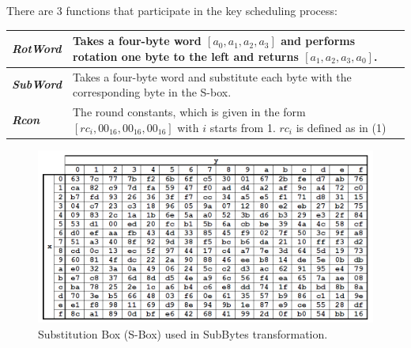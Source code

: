 \documentclass[a4paper, 10pt]{article}
\begin{document}
\begin{multicols}{2}
                There are 3 functions that participate in the key scheduling process:

                    \setlength{\tabcolsep}{5pt} %
                    \renewcommand{\arraystretch}{1.5} %
                    \noindent
                        \begin{tabular}{m{2cm} m{6cm}}
                            \textbf{\textit{RotWord}} & Takes a four-byte word $[a_{0},a_{1},a_{2},a_{3}]$ and performs rotation one byte to the left and returns $[a_{1},a_{2},a_{3},a_{0}]$.\\
                            \hline
                            \textbf{\textit{SubWord}} & Takes a four-byte word and substitute each byte with the corresponding byte in the S-box.\\
                            \hline
                            \textbf{\textit{Rcon}} & The round constants, which is given in the form $[rc_{i},00_{16},00_{16},00_{16}]$ with $i$ starts from 1. $rc_{i}$ is defined as in (1)\\
                        \end{tabular}
                    \end{multicols}

                    \noindent
                    \begin{figure}[t]
                        \centering
                        \includegraphics[width=.7\textwidth]{S-Box.png}
                        \caption{Substitution Box (S-Box) used in SubBytes transformation.}
                        \label{fig:SBox}
                    \end{figure}
\end{document}
